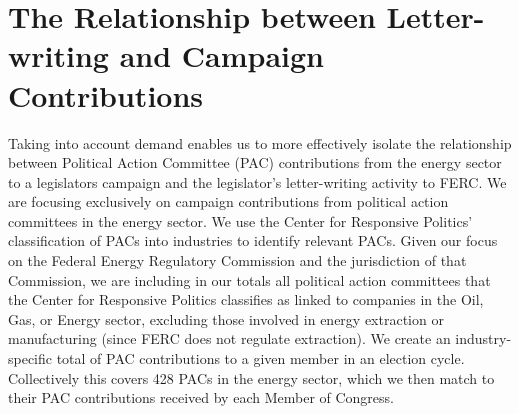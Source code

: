 \documentclass{article}
\begin{document}


\section{The Relationship between Letter-writing and Campaign Contributions}

Taking into account demand enables us to more effectively isolate the relationship between Political Action Committee (PAC) contributions from the energy sector to a legislators campaign and the legislator's letter-writing activity to FERC.  We are focusing exclusively on campaign contributions from political action committees in the energy sector.  We use the Center for Responsive Politics' classification of PACs into industries to identify relevant PACs.  Given our focus on the Federal Energy Regulatory Commission and the jurisdiction of that Commission, we are including in our totals all political action committees that the Center for Responsive Politics classifies as linked to companies in the Oil, Gas, or Energy sector, excluding those involved in energy extraction or manufacturing (since FERC does not regulate extraction).  We create an industry-specific total of PAC contributions to a given member in an election cycle.  Collectively this covers 428 PACs in the energy sector, which we then match to their PAC contributions received by each Member of Congress.
 
\end{document}
